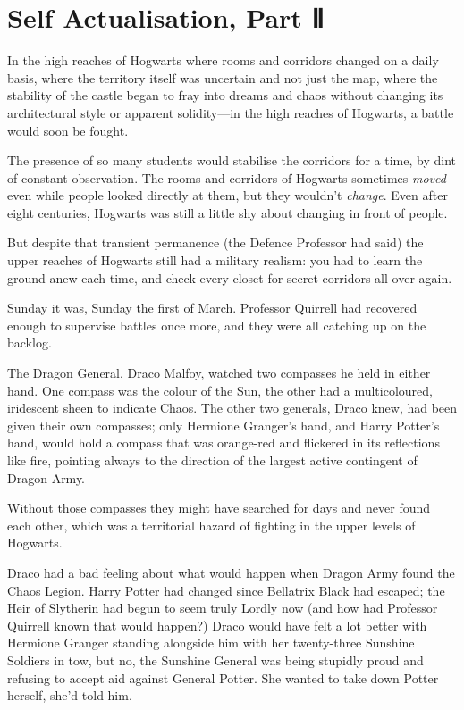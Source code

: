 \chapter{Self Actualisation, Part Ⅱ}

In the high reaches of Hogwarts where rooms and corridors changed on a
daily basis, where the territory itself was uncertain and not just the
map, where the stability of the castle began to fray into dreams and
chaos without changing its architectural style or apparent solidity---in
the high reaches of Hogwarts, a battle would soon be fought.

The presence of so many students would stabilise the corridors for a
time, by dint of constant observation. The rooms and corridors of
Hogwarts sometimes \emph{moved} even while people looked directly at
them, but they wouldn't \emph{change}. Even after eight centuries,
Hogwarts was still a little shy about changing in front of people.

But despite that transient permanence (the Defence Professor had said)
the upper reaches of Hogwarts still had a military realism: you had to
learn the ground anew each time, and check every closet for secret
corridors all over again.

Sunday it was, Sunday the first of March. Professor Quirrell had
recovered enough to supervise battles once more, and they were all
catching up on the backlog.

The Dragon General, Draco Malfoy, watched two compasses he held in
either hand. One compass was the colour of the Sun, the other had a
multicoloured, iridescent sheen to indicate Chaos. The other two
generals, Draco knew, had been given their own compasses; only Hermione
Granger's hand, and Harry Potter's hand, would hold a compass that was
orange-red and flickered in its reflections like fire, pointing always
to the direction of the largest active contingent of Dragon Army.

Without those compasses they might have searched for days and never
found each other, which was a territorial hazard of fighting in the
upper levels of Hogwarts.

Draco had a bad feeling about what would happen when Dragon Army found
the Chaos Legion. Harry Potter had changed since Bellatrix Black had
escaped; the Heir of Slytherin had begun to seem truly Lordly now (and
how had Professor Quirrell known that would happen?) Draco would have
felt a lot better with Hermione Granger standing alongside him with her
twenty-three Sunshine Soldiers in tow, but no, the Sunshine General was
being stupidly proud and refusing to accept aid against General Potter.
She wanted to take down Potter herself, she'd told him.

